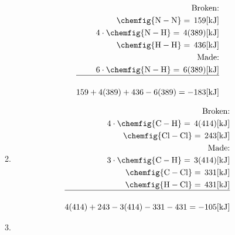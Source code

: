 \documentclass[12pt]{article}
\begin{document}
\begin{enumerate}
\begin{enumerate}
        \begin{equation}
          \begin{split}
            \text{Broken:}\\
            \chemfig{\ce{N}-\ce{N}}=\,159[\si{\kilo\joule}]\\
            4\cdot\chemfig{\ce{N}-\ce{H}}=\,4(389)[\si{\kilo\joule}]\\
            \chemfig{\ce{H}-\ce{H}}=\,436[\si{\kilo\joule}]\\
            \text{Made:}\\
            6\cdot\chemfig{\ce{N}-\ce{H}}=\,6(389)[\si{\kilo\joule}]\\
            \hline\\
            159+4(389)+436-6(389)=-183[\si{\kilo\joule}]
          \end{split}
          \label{4}
        \end{equation}

      \item {}

        \begin{equation}
          \begin{split}
            \text{Broken:}\\
            4\cdot\chemfig{\ce{C}-\ce{H}}=\,4(414)[\si{\kilo\joule}]\\
            \chemfig{\ce{Cl}-\ce{Cl}}=\,243[\si{\kilo\joule}]\\
            \text{Made:}\\
            3\cdot\chemfig{\ce{C}-\ce{H}}=\,3(414)[\si{\kilo\joule}]\\
            \chemfig{\ce{C}-\ce{Cl}}=\,331[\si{\kilo\joule}]\\
            \chemfig{\ce{H}-\ce{Cl}}=\,431[\si{\kilo\joule}]\\
            \hline\\
            4(414)+243-3(414)-331-431=-105[\si{\kilo\joule}]\\
          \end{split}
          \label{5}
        \end{equation}

      \item {}


\end{enumerate}
\end{enumerate}
\end{document}

